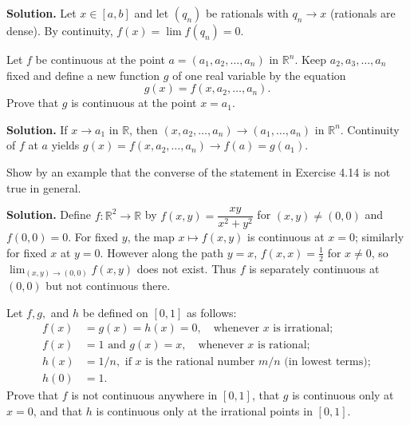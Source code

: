 \noindent\textbf{Solution.}
Let $x\in[a,b]$ and let $(q_n)$ be rationals with $q_n\to x$ (rationals are dense). By continuity, $f(x)=\lim f(q_n)=0$.
\medskip

\begin{problembox}
Let \( f \) be continuous at the point \( a = (a_1, a_2, \ldots, a_n) \) in \( \mathbb{R}^n \). Keep \( a_2, a_3, \ldots, a_n \) fixed and define a new function \( g \) of one real variable by the equation
\[g(x) = f(x, a_2, \ldots, a_n).\]
Prove that \( g \) is continuous at the point \( x = a_1 \).
\end{problembox}

\noindent\textbf{Solution.}
If $x\to a_1$ in $\mathbb{R}$, then $(x,a_2,\ldots,a_n)\to(a_1,\ldots,a_n)$ in $\mathbb{R}^n$. Continuity of $f$ at $a$ yields $g(x)=f(x,a_2,\ldots,a_n)\to f(a)=g(a_1)$.
\medskip

\begin{problembox}
Show by an example that the converse of the statement in Exercise 4.14 is not true in general.
\end{problembox}

\noindent\textbf{Solution.}
Define $f:\mathbb{R}^2\to\mathbb{R}$ by $f(x,y)=\dfrac{xy}{x^2+y^2}$ for $(x,y)\ne(0,0)$ and $f(0,0)=0$. For fixed $y$, the map $x\mapsto f(x,y)$ is continuous at $x=0$; similarly for fixed $x$ at $y=0$. However along the path $y=x$, $f(x,x)=\tfrac{1}{2}$ for $x\ne0$, so $\lim_{(x,y)\to(0,0)}f(x,y)$ does not exist. Thus $f$ is separately continuous at $(0,0)$ but not continuous there.
\medskip

\begin{problembox}
Let \( f, g, \) and \( h \) be defined on \([0, 1]\) as follows:
\begin{align*}
f(x) &= g(x) = h(x) = 0, \quad \text{whenever } x \text{ is irrational}; \\
f(x) &= 1 \text{ and } g(x) = x, \quad \text{whenever } x \text{ is rational}; \\
h(x) &= 1/n, \text{ if } x \text{ is the rational number } m/n \text{ (in lowest terms)}; \\
h(0) &= 1.
\end{align*}
Prove that \( f \) is not continuous anywhere in \([0, 1]\), that \( g \) is continuous only at \( x = 0 \), and that \( h \) is continuous only at the irrational points in \([0, 1]\).
\end{problembox}

